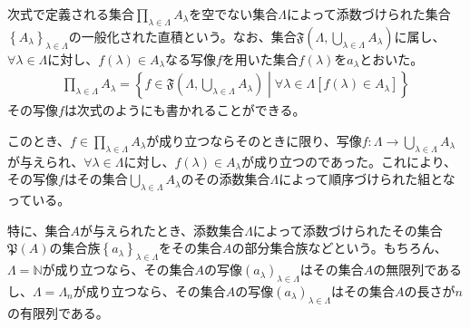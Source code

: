 \documentclass[dvipdfmx]{jsarticle}
\begin{document}
\begin{dfn}
次式で定義される集合$\prod_{\lambda \in \varLambda} A_{\lambda}$を空でない集合$\varLambda$によって添数づけられた集合$\left\{ A_{\lambda} \right\}_{\lambda \in \varLambda}$の一般化された直積という。なお、集合$\mathfrak{F}\left( \varLambda,\bigcup_{\lambda \in \varLambda} A_{\lambda} \right)$に属し、$\forall\lambda \in \varLambda$に対し、$f(\lambda) \in A_{\lambda}$なる写像$f$を用いた集合$f(\lambda)$を$a_{\lambda}$とおいた。
\begin{align*}
\prod_{\lambda \in \varLambda} A_{\lambda} = \left\{ f \in \mathfrak{F}\left( \varLambda,\bigcup_{\lambda \in \varLambda} A_{\lambda} \right) \middle| \forall\lambda \in \varLambda\left[ f(\lambda) \in A_{\lambda} \right] \right\}
\end{align*}
その写像$f$は次式のようにも書かれることができる。
\begin{center}
\end{center}
\end{dfn}
このとき、$f \in \prod_{\lambda \in \varLambda} A_{\lambda}$が成り立つならそのときに限り、写像$f:\varLambda \rightarrow \bigcup_{\lambda \in \varLambda} A_{\lambda}$が与えられ、$\forall\lambda \in \varLambda$に対し、$f(\lambda) \in A_{\lambda}$が成り立つのであった。これにより、その写像$f$はその集合$\bigcup_{\lambda \in \varLambda} A_{\lambda}$のその添数集合$\varLambda$によって順序づけられた組となっている。
\begin{dfn}
特に、集合$A$が与えられたとき、添数集合$\varLambda$によって添数づけられたその集合$\mathfrak{P}(A)$の集合族$\left\{ a_{\lambda} \right\}_{\lambda \in \varLambda}$をその集合$A$の部分集合族などという。もちろん、$\varLambda = \mathbb{N}$が成り立つなら、その集合$A$の写像$\left( a_{\lambda} \right)_{\lambda \in \varLambda}$はその集合$A$の無限列であるし、$\varLambda = \varLambda_{n}$が成り立つなら、その集合$A$の写像$\left( a_{\lambda} \right)_{\lambda \in \varLambda}$はその集合$A$の長さが$n$の有限列である。
\end{dfn}
\end{document}
